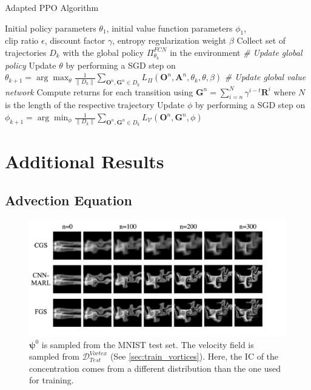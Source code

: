 \begin{algorithm}[tb]
   \caption{Adapted PPO Algorithm}
    \label{algo:ppo}
\begin{algorithmic}
    Initial policy parameters \( \theta_1 \), initial value function parameters \( \phi_1 \), \\
 clip ratio \( \epsilon\), discount factor \(\gamma\), entropy regularization weight \(\beta\)
   \STATE Collect set of trajectories \( D_k  \) with the  global policy \( \Pi^{FCN}_{\theta_k} \) in the environment
   \STATE \textit{\# Update global policy}
   \STATE Update $\theta$ by performing a SGD step on \( \theta_{k+1} = \arg \max_\theta \frac{1}{\|D_k\|}\sum_{\boldsymbol{O}^n, \boldsymbol G^n \in D_k} L_{\Pi}(\boldsymbol O^n, \boldsymbol A^n, \theta_k, \theta, \beta) \)
   \STATE \textit{\# Update global value network}
    \STATE Compute returns for each transition using \( \boldsymbol{G}^n=\sum_{i=n}^N \gamma^{i-t} \boldsymbol{R}^i \) where $N$ is the length of the respective trajectory
    \STATE Update $\phi$ by performing a SGD step on \( \phi_{k+1} = \arg \min_\phi \frac{1}{\|D_k\|}\sum_{\boldsymbol{O}^n, \boldsymbol G^n \in D_k} L_{\mathcal V}(\boldsymbol{O}^n, \boldsymbol{G}^n, \phi) \)
   \ENDFOR
\end{algorithmic}
\end{algorithm}

\newpage
\section{Additional Results}
\subsection{Advection Equation}
\begin{figure}[ht]
\vskip 0.2in
\begin{center}
\centerline{\includegraphics[width=0.75\columnwidth]{illustrations/advection/fashion_train_illustration.png}}
\caption{$\boldsymbol \psi^0$ is sampled from the MNIST test set. The velocity field is sampled from $\mathcal D^{Vortex}_{Test}$ (See \cref{sec:train_vortices}). Here, the IC of the concentration comes from a different distribution than the one used for training.}
\end{center}
\vskip -0.2in
\end{figure}

